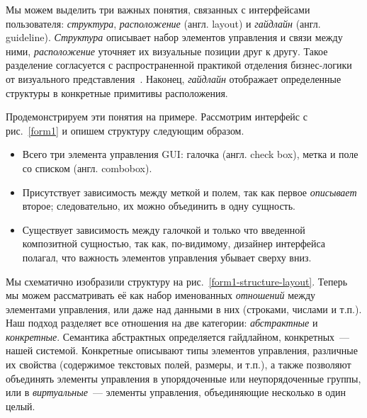 Мы можем выделить три важных понятия, связанных с интерфейсами пользователя:
\emph{структура}, \emph{расположение} (англ. layout) и \emph{гайдлайн} (англ. guideline).
\emph{Структура} описывает набор элементов управления и связи между ними, \emph{расположение} уточняет их визуальные позиции друг к другу.
Такое разделение согласуется с распространенной практикой отделения бизнес-логики от визуального представления~\cite{UI3}.
Наконец, \emph{гайдлайн} отображает определенные структуры в конкретные примитивы расположения.


Продемонстрируем эти понятия на примере. Рассмотрим интерфейс с рис.~\ref{form1} и опишем структуру следующим образом.
\begin{itemize}
\item Всего три элемента управления GUI: галочка (англ. check box), метка и  поле со списком (англ. combobox).
\item Присутствует зависимость между меткой и полем, так как первое \emph{описывает} второе;
следовательно, их можно объединить в одну сущность.
\item Существует зависимость между галочкой и только что введенной композитной сущностью, так как, по-видимому, дизайнер интерфейса полагал, что важность элементов управления убывает сверху вниз.
\end{itemize}

Мы схематично изобразили структуру на рис.~\ref{form1-structure-layout}.
Теперь мы можем рассматривать её как набор именованных \emph{отношений} между элементами управления, или даже над данными в них (строками, числами и т.п.).
Наш подход разделяет все отношения на две категории: \emph{абстрактные} и \emph{конкретные}.
Семантика абстрактных определяется гайдлайном, конкретных~--- нашей системой.
Конкретные описывают типы элементов управления, различные их свойства (содержимое текстовых полей, размеры, и т.п.),
а также позволяют объединять элементы управления в упорядоченные или неупорядоченные группы, или в \emph{виртуальные}~--- элементы управления, объединяющие несколько в один целый.

